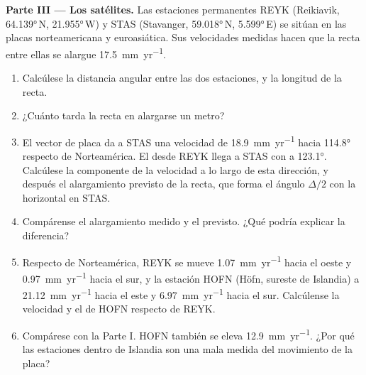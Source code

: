 \begin{problem}
\noindent\textbf{Parte III --- Los satélites.}
Las estaciones permanentes REYK (Reikiavik, \ang{64.139}\,N, \ang{21.955}\,W) y STAS (Stavanger, \ang{59.018}\,N, \ang{5.599}\,E) se sitúan
en las placas norteamericana y euroasiática. Sus velocidades medidas hacen que la recta entre ellas se alargue \qty{17.5}{mm.yr^{-1}}.
\begin{enumerate}[resume]
  \item Calcúlese la distancia angular entre las dos estaciones, y la longitud de la recta.
  \item ¿Cuánto tarda la recta en alargarse un metro?
  \item El vector de placa da a STAS una velocidad de \qty{18.9}{mm.yr^{-1}} hacia \ang{114.8} respecto de Norteamérica. El 
        desde REYK llega a STAS con  a \ang{123.1}. Calcúlese la componente de la velocidad a lo largo de esta dirección, y después
        el alargamiento previsto de la recta, que forma el ángulo $\Delta/2$ con la horizontal en STAS.
  \item Compárense el alargamiento medido y el previsto. ¿Qué podría explicar la diferencia?
  \item Respecto de Norteamérica, REYK se mueve \qty{1.07}{mm.yr^{-1}} hacia el oeste y \qty{0.97}{mm.yr^{-1}} hacia el sur, y la
        estación HOFN (Höfn, sureste de Islandia) a \qty{21.12}{mm.yr^{-1}} hacia el este y \qty{6.97}{mm.yr^{-1}} hacia el sur.
        Calcúlense la velocidad y el  de HOFN respecto de REYK.
  \item Compárese con la Parte I. HOFN también se eleva \qty{12.9}{mm.yr^{-1}}. ¿Por qué las estaciones dentro de Islandia son una mala
        medida del movimiento de la placa?
\end{enumerate}


\end{problem}
